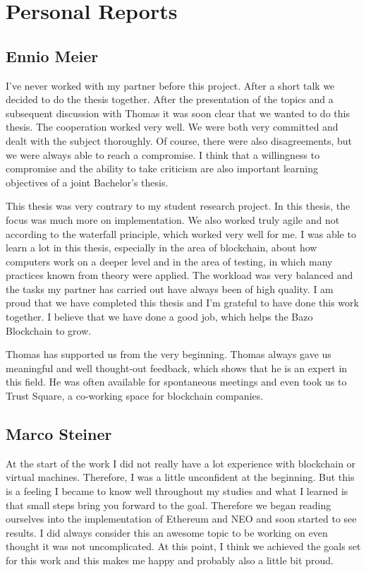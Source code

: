 \chapter{Personal Reports}
\section{Ennio Meier}
I've never worked with my partner before this project. After a short talk we decided to do the thesis together. After the presentation of the topics and a subsequent discussion with Thomas it was soon clear that we wanted to do this thesis. The cooperation worked very well. We were both very committed and dealt with the subject thoroughly. Of course, there were also disagreements, but we were always able to reach a compromise. I think that a willingness to compromise and the ability to take criticism are also important learning objectives of a joint Bachelor's thesis. 

This thesis was very contrary to my student research project. In this thesis, the focus was much more on implementation. We also worked truly agile and not according to the waterfall principle, which worked very well for me. I was able to learn a lot in this thesis, especially in the area of blockchain, about how computers work on a deeper level and in the area of testing, in which many practices known from theory were applied. The workload was very balanced and the tasks my partner has carried out have always been of high quality. I am proud that we have completed this thesis and I'm grateful to have done this work together. I believe that we have done a good job, which helps the Bazo Blockchain to grow.

Thomas has supported us from the very beginning. Thomas always gave us meaningful and well thought-out feedback, which shows that he is an expert in this field. He was often available for spontaneous meetings and even took us to Trust Square, a co-working space for blockchain companies. 

\section{Marco Steiner}
At the start of the work I did not really have a lot experience with blockchain or virtual machines. Therefore, I was a little unconfident at the beginning. But this is a feeling I became to know well throughout my studies and what I learned is that small steps bring you forward to the goal. Therefore we began reading ourselves into the implementation of Ethereum and NEO and soon started to see results. I did always consider this an awesome topic to be working on even thought it was not uncomplicated. At this point, I think we achieved the goals set for this work and this makes me happy and probably also a little bit proud. 

